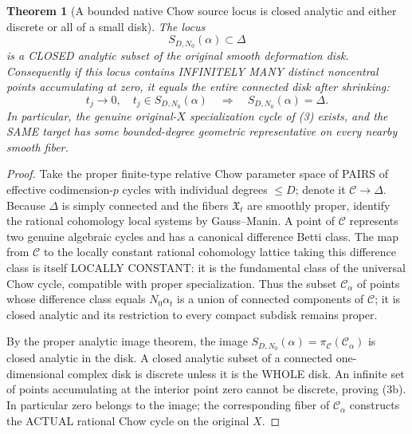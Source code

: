 \documentclass[11pt]{article}
\newtheorem{theorem}{Theorem}
\begin{document}
\begin{theorem}[A bounded native Chow source locus is closed analytic and either discrete or all of a small disk]
The locus
\[
            \boxed{S_{D,N_0}(\alpha)
                              \subset\Delta}
                                                               \tag{3a}
\]
is a CLOSED analytic
subset of the
original smooth
deformation disk.
Consequently
if this locus
contains
INFINITELY MANY
distinct noncentral
points accumulating
at zero, it
equals the
entire connected
disk after
shrinking:
\[
 \boxed{
  t_j\to0,\quad
  t_j\in S_{D,N_0}(\alpha)
   \quad\Longrightarrow\quad
  S_{D,N_0}(\alpha)=\Delta .
 }                                                       \tag{3b}
\]
In particular,
the genuine
original-\(X\)
specialization
cycle of (3)
exists, and
the SAME target
has some
bounded-degree
geometric
representative on
every nearby
smooth fiber.
\end{theorem}
\begin{proof}
Take the proper
finite-type
relative Chow
parameter space
of PAIRS of
effective
codimension-\(p\)
cycles with
individual
degrees \(\le D\);
denote it
\(\mathscr C\to\Delta\).
Because
\(\Delta\) is
simply connected
and the fibers
\(\mathfrak X_t\)
are smoothly
proper, identify
the rational
cohomology local
systems by
Gauss--Manin.
A point of
\(\mathscr C\)
represents two
genuine algebraic
cycles and has
a canonical
difference Betti
class. The map
from \(\mathscr C\)
to the
locally constant
rational
cohomology lattice
taking this
difference class
is itself
LOCALLY CONSTANT:
it is the
fundamental
class of the
universal Chow
cycle,
compatible with
proper
specialization.
Thus the subset
\(\mathscr C_\alpha\)
of points
whose difference
class equals
\(N_0\alpha_t\)
is a union of
connected
components of
\(\mathscr C\);
it is closed
analytic and
its restriction
to every compact
subdisk remains
proper.

By the proper
analytic image
theorem, the
image
\(
 S_{D,N_0}(\alpha)
 =\pi_{\mathscr C}
            (\mathscr C_\alpha)
\)
is closed
analytic in
the disk.
A closed
analytic subset
of a
connected
one-dimensional
complex disk
is discrete
unless it is
the WHOLE disk.
An infinite
set of points
accumulating at
the interior
point zero
cannot be
discrete, proving
(3b). In
particular zero
belongs to
the image;
the corresponding
fiber of
\(\mathscr C_\alpha\)
constructs
the ACTUAL
rational Chow
cycle on the
original \(X\).
\end{proof}
\end{document}
